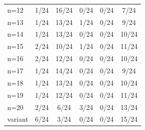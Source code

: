 \begin{tabular}{lccccc}
n=12 & \cellcolor[HTML]{FFFFFF} 1/24 & \cellcolor[HTML]{EA4646} 16/24 & \cellcolor[HTML]{9670BD} 0/24 & \cellcolor[HTML]{8FEB32} 0/24 & \cellcolor[HTML]{19C8C8} 7/24 \\
n=13 & \cellcolor[HTML]{FFFFFF} 1/24 & \cellcolor[HTML]{EA4646} 13/24 & \cellcolor[HTML]{9670BD} 1/24 & \cellcolor[HTML]{8FEB32} 0/24 & \cellcolor[HTML]{19C8C8} 9/24 \\
n=14 & \cellcolor[HTML]{FFFFFF} 1/24 & \cellcolor[HTML]{EA4646} 13/24 & \cellcolor[HTML]{9670BD} 0/24 & \cellcolor[HTML]{8FEB32} 0/24 & \cellcolor[HTML]{19C8C8} 10/24 \\
n=15 & \cellcolor[HTML]{FFFFFF} 2/24 & \cellcolor[HTML]{EA4646} 10/24 & \cellcolor[HTML]{9670BD} 1/24 & \cellcolor[HTML]{8FEB32} 0/24 & \cellcolor[HTML]{19C8C8} 11/24 \\
n=16 & \cellcolor[HTML]{FFFFFF} 2/24 & \cellcolor[HTML]{EA4646} 12/24 & \cellcolor[HTML]{9670BD} 0/24 & \cellcolor[HTML]{8FEB32} 0/24 & \cellcolor[HTML]{19C8C8} 10/24 \\
n=17 & \cellcolor[HTML]{FFFFFF} 1/24 & \cellcolor[HTML]{EA4646} 14/24 & \cellcolor[HTML]{9670BD} 0/24 & \cellcolor[HTML]{8FEB32} 0/24 & \cellcolor[HTML]{19C8C8} 9/24 \\
n=18 & \cellcolor[HTML]{FFFFFF} 1/24 & \cellcolor[HTML]{EA4646} 13/24 & \cellcolor[HTML]{9670BD} 0/24 & \cellcolor[HTML]{8FEB32} 0/24 & \cellcolor[HTML]{19C8C8} 10/24 \\
n=19 & \cellcolor[HTML]{FFFFFF} 1/24 & \cellcolor[HTML]{EA4646} 12/24 & \cellcolor[HTML]{9670BD} 0/24 & \cellcolor[HTML]{8FEB32} 0/24 & \cellcolor[HTML]{19C8C8} 11/24 \\
n=20 & \cellcolor[HTML]{FFFFFF} 2/24 & \cellcolor[HTML]{EA4646} 6/24 & \cellcolor[HTML]{9670BD} 3/24 & \cellcolor[HTML]{8FEB32} 0/24 & \cellcolor[HTML]{19C8C8} 13/24 \\
variant & \cellcolor[HTML]{FFFFFF} 6/24 & \cellcolor[HTML]{EA4646} 3/24 & \cellcolor[HTML]{9670BD} 0/24 & \cellcolor[HTML]{8FEB32} 0/24 & \cellcolor[HTML]{19C8C8} 15/24 \\
\bottomrule
\end{tabular}
